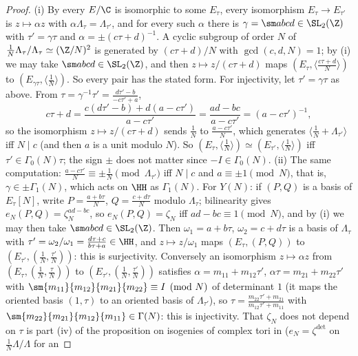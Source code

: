 \begin{proof}
(i) By  every $E/\C$ is isomorphic to some $E_\tau$, every isomorphism $E_\tau\to E_{\tau'}$ is $z\mapsto\alpha z$ with $\alpha\Lambda_\tau=\Lambda_{\tau'}$, and for every such $\alpha$
there is $\gamma=\sm abcd\in\SL_2(\Z)$ with $\tau'=\gamma\tau$ and $\alpha=\pm(c\tau+d)^{-1}$. A cyclic subgroup of order $N$ of $\frac1N\Lambda_\tau/\Lambda_\tau\simeq(\Z/N)^2$ is generated by
$(c\tau+d)/N$ with $\gcd(c,d,N)=1$; by (i) we may take $\sm abcd\in\SL_2(\Z)$, and then $z\mapsto z/(c\tau+d)$ maps $(E_\tau,\langle\frac{c\tau+d}N\rangle)$
to $(E_{\gamma\tau},\langle\frac1N\rangle)$. So every pair has the stated form. For injectivity, let $\tau'=\gamma\tau$ as above. From $\tau=\gamma^{-1}\tau'=\frac{d\tau'-b}{-c\tau'+a}$,
\[
c\tau+d=\frac{c(d\tau'-b)+d(a-c\tau')}{a-c\tau'}=\frac{ad-bc}{a-c\tau'}=(a-c\tau')^{-1},
\]
so the isomorphism $z\mapsto z/(c\tau+d)$ sends $\frac1N$ to $\frac{a-c\tau'}N$, which generates $\langle\frac1N+\Lambda_{\tau'}\rangle$ iff $N\mid c$ (and then $a$ is a
unit modulo $N$). So $(E_\tau,\langle\frac1N\rangle)\simeq(E_{\tau'},\langle\frac1N\rangle)$ iff $\tau'\in\Gamma_0(N)\tau$; the sign $\pm$ does not matter since $-I\in\Gamma_0(N)$.
(ii) The same computation: $\frac{a-c\tau'}N\equiv\pm\frac1N\pmod{\Lambda_{\tau'}}$ iff $N\mid c$ and $a\equiv\pm1\pmod N$, that is, $\gamma\in\pm\Gamma_1(N)$, which acts on $\HH$ as $\Gamma_1(N)$.
For $Y(N)$: if $(P,Q)$ is a basis of $E_\tau[N]$, write $P=\frac{a+b\tau}N$, $Q=\frac{c+d\tau}N$ modulo $\Lambda_\tau$; bilinearity gives $e_N(P,Q)=\zeta_N^{ad-bc}$, so $e_N(P,Q)=\zeta_N$ iff
$ad-bc\equiv1\pmod N$, and by (i) we may then take $\sm abcd\in\SL_2(\Z)$. Then $\omega_1=a+b\tau$, $\omega_2=c+d\tau$ is a basis of $\Lambda_\tau$ with
$\tau'=\omega_2/\omega_1=\frac{d\tau+c}{b\tau+a}\in\HH$, and $z\mapsto z/\omega_1$ maps $(E_\tau,(P,Q))$ to $(E_{\tau'},(\frac1N,\frac{\tau'}N))$: this is surjectivity. Conversely an isomorphism
$z\mapsto\alpha z$ from $(E_\tau,(\frac1N,\frac\tau N))$ to $(E_{\tau'},(\frac1N,\frac{\tau'}N))$ satisfies $\alpha=m_{11}+m_{12}\tau'$, $\alpha\tau=m_{21}+m_{22}\tau'$ with $\sm{m_{11}}{m_{12}}{m_{21}}{m_{22}}\equiv I\pmod N$ of
determinant $1$ (it maps the oriented basis $(1,\tau)$ to an oriented basis of $\Lambda_{\tau'}$), so $\tau=\frac{m_{22}\tau'+m_{21}}{m_{12}\tau'+m_{11}}$ with $\sm{m_{22}}{m_{21}}{m_{12}}{m_{11}}\in\Gamma(N)$: this is injectivity.
That $\zeta_N$ does not depend on $\tau$ is part (iv) of the proposition on isogenies of complex tori in  ($e_N=\zeta^{\det}$ on $\frac1N\Lambda/\Lambda$ for an

\end{proof}
